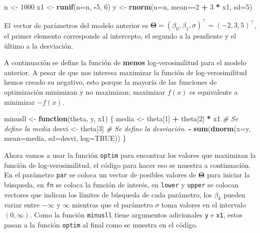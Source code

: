 \documentclass[10pt,]{krantz}
\makeatletter
\newenvironment{Shaded}{\begin{snugshade}}{\end{snugshade}}
\newcommand{\KeywordTok}[1]{\textcolor[rgb]{0.13,0.29,0.53}{\textbf{#1}}}
\newcommand{\DataTypeTok}[1]{\textcolor[rgb]{0.13,0.29,0.53}{#1}}
\newcommand{\DecValTok}[1]{\textcolor[rgb]{0.00,0.00,0.81}{#1}}
\newcommand{\StringTok}[1]{\textcolor[rgb]{0.31,0.60,0.02}{#1}}
\newcommand{\CommentTok}[1]{\textcolor[rgb]{0.56,0.35,0.01}{\textit{#1}}}
\newcommand{\OtherTok}[1]{\textcolor[rgb]{0.56,0.35,0.01}{#1}}
\newcommand{\ControlFlowTok}[1]{\textcolor[rgb]{0.13,0.29,0.53}{\textbf{#1}}}
\newcommand{\OperatorTok}[1]{\textcolor[rgb]{0.81,0.36,0.00}{\textbf{#1}}}
\newcommand{\NormalTok}[1]{#1}
\newenvironment{kframe}{%
\medskip{}
\setlength{\fboxsep}{.8em}
 \def\at@end@of@kframe{}%
 \ifinner\ifhmode%
  \def\at@end@of@kframe{\end{minipage}}%
  \begin{minipage}{\columnwidth}%
 \fi\fi%
 \def\FrameCommand##1{\hskip\@totalleftmargin \hskip-\fboxsep
 \colorbox{shadecolor}{##1}\hskip-\fboxsep
     \hskip-\linewidth \hskip-\@totalleftmargin \hskip\columnwidth}%
 \MakeFramed {\advance\hsize-\width
   \@totalleftmargin\z@ \linewidth\hsize
   \@setminipage}}%
 {\par\unskip\endMakeFramed%
 \at@end@of@kframe}
\renewenvironment{Shaded}{\begin{kframe}}{\end{kframe}}
\makeatother
\begin{document}
\begin{Shaded}
\begin{Highlighting}[]
\NormalTok{n <-}\StringTok{ }\DecValTok{1000}
\NormalTok{x1 <-}\StringTok{ }\KeywordTok{runif}\NormalTok{(}\DataTypeTok{n=}\NormalTok{n, }\OperatorTok{-}\DecValTok{5}\NormalTok{, }\DecValTok{6}\NormalTok{)}
\NormalTok{y <-}\StringTok{ }\KeywordTok{rnorm}\NormalTok{(}\DataTypeTok{n=}\NormalTok{n, }\DataTypeTok{mean=}\OperatorTok{-}\DecValTok{2} \OperatorTok{+}\StringTok{ }\DecValTok{3} \OperatorTok{*}\StringTok{ }\NormalTok{x1, }\DataTypeTok{sd=}\DecValTok{5}\NormalTok{)}
\end{Highlighting}
\end{Shaded}

El vector de parámetros del modelo anterior es
\(\boldsymbol{\Theta}=(\beta_0, \beta_1, \sigma)^\top=(-2, 3, 5)^\top\),
el primer elemento corresponde al intercepto, el segundo a la pendiente
y el último a la desviación.

A continuación se define la función de \textbf{menos} log-verosimilitud
para el modelo anterior. A pesar de que nos interesa maximizar la
función de log-verosimilitud hemos creado su negativo, esto porque la
mayoría de las funciones de optimización minimizan y no maximizan;
maximizar \(f(x)\) es equivalente a minimizar \(-f(x)\).

\begin{Shaded}
\begin{Highlighting}[]
\NormalTok{minusll <-}\StringTok{ }\ControlFlowTok{function}\NormalTok{(theta, y, x1) \{}
\NormalTok{  media <-}\StringTok{ }\NormalTok{theta[}\DecValTok{1}\NormalTok{] }\OperatorTok{+}\StringTok{ }\NormalTok{theta[}\DecValTok{2}\NormalTok{] }\OperatorTok{*}\StringTok{ }\NormalTok{x1  }\CommentTok{# Se define la media}
\NormalTok{  desvi <-}\StringTok{ }\NormalTok{theta[}\DecValTok{3}\NormalTok{]                  }\CommentTok{# Se define la desviación.}
  \OperatorTok{-}\StringTok{ }\KeywordTok{sum}\NormalTok{(}\KeywordTok{dnorm}\NormalTok{(}\DataTypeTok{x=}\NormalTok{y, }\DataTypeTok{mean=}\NormalTok{media, }\DataTypeTok{sd=}\NormalTok{desvi, }\DataTypeTok{log=}\OtherTok{TRUE}\NormalTok{))}
\NormalTok{\}}
\end{Highlighting}
\end{Shaded}

Ahora vamos a usar la función \texttt{optim} para encontrar los valores
que maximizan la función de log-verosimilitud, el código para hacer eso
se muestra a continuación. En el parámetro \texttt{par} se coloca un
vector de posibles valores de \(\boldsymbol{\Theta}\) para iniciar la
búsqueda, en \texttt{fn} se coloca la función de interés, en
\texttt{lower} y \texttt{upper} se colocan vectores que indican los
límites de búsqueda de cada parámetro, los \(\beta_k\) pueden variar
entre \(-\infty\) y \(\infty\) mientras que el parámetro \(\sigma\) toma
valores en el intervalo \((0, \infty)\). Como la función
\texttt{minusll} tiene argumentos adicionales \texttt{y} e \texttt{x1},
estos pasan a la función \texttt{optim} al final como se muestra en el
código.
\end{document}
